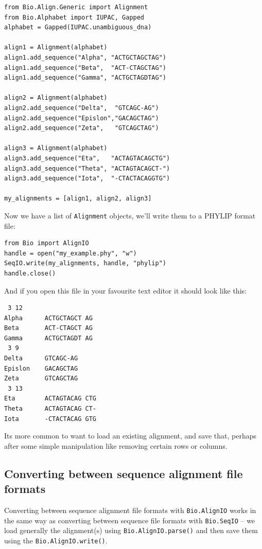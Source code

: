 \documentclass{report}
\begin{document}
\begin{verbatim}
from Bio.Align.Generic import Alignment
from Bio.Alphabet import IUPAC, Gapped
alphabet = Gapped(IUPAC.unambiguous_dna)

align1 = Alignment(alphabet)
align1.add_sequence("Alpha", "ACTGCTAGCTAG")
align1.add_sequence("Beta",  "ACT-CTAGCTAG")
align1.add_sequence("Gamma", "ACTGCTAGDTAG")

align2 = Alignment(alphabet)
align2.add_sequence("Delta",  "GTCAGC-AG")
align2.add_sequence("Epislon","GACAGCTAG")
align2.add_sequence("Zeta",   "GTCAGCTAG")

align3 = Alignment(alphabet)
align3.add_sequence("Eta",   "ACTAGTACAGCTG")
align3.add_sequence("Theta", "ACTAGTACAGCT-")
align3.add_sequence("Iota",  "-CTACTACAGGTG")

my_alignments = [align1, align2, align3]
\end{verbatim}

\noindent Now we have a list of \verb|Alignment| objects, we'll write them to a PHYLIP format file:

\begin{verbatim}
from Bio import AlignIO
handle = open("my_example.phy", "w")
SeqIO.write(my_alignments, handle, "phylip")
handle.close()
\end{verbatim}

\noindent And if you open this file in your favourite text editor it should look like this:

\begin{verbatim}
 3 12
Alpha      ACTGCTAGCT AG
Beta       ACT-CTAGCT AG
Gamma      ACTGCTAGDT AG
 3 9
Delta      GTCAGC-AG
Epislon    GACAGCTAG
Zeta       GTCAGCTAG
 3 13
Eta        ACTAGTACAG CTG
Theta      ACTAGTACAG CT-
Iota       -CTACTACAG GTG
\end{verbatim}

Its more common to want to load an existing alignment, and save that, perhaps after some simple manipulation like removing certain rows or columns.

\subsection{Converting between sequence alignment file formats}

Converting between sequence alignment file formats with \verb|Bio.AlignIO| works in the same way as converting between sequence file formats with \verb|Bio.SeqIO| -- we load generally the alignment(s) using \verb|Bio.AlignIO.parse()| and then save them using the \verb|Bio.AlignIO.write()|.
\end{document}
